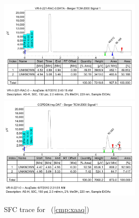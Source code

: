 \begin{figure}[h]
\centering
\includegraphics[width=2.75in]{chp_asymmetric/images/sfc/xaaq-rac.png}
\includegraphics[width=2.75in]{chp_asymmetric/images/sfc/xaaq.png}
\caption{SFC trace for \CMPxaaq~(\ref{cmp:xaaq})}
\vspace{-10pt}
\end{figure}

